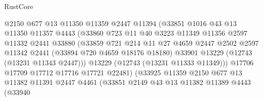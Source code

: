 \begin{lexlean}{RustCore}
\begin{coremodule}
                              @2150
                              @677
                              @13
                              @11350
                              @11359
                              @2447
                              @11394
                              (@33851
                                @1016
                                @43
                                @13
                                @11350
                                @11357
                                @4443
                                (@33860
                                  @723
                                  @11
                                  @40
                                  @3223
                                  @11349
                                  @11356
                                  @2597
                                  @11332
                                  @2441
                                  @33880
                                  (@33859
                                    @721
                                    @214
                                    @11
                                    @27
                                    @4659
                                    @2447
                                    @2502
                                    @2597
                                    @11342
                                    @2441
                                    (@33894 @720 @4659 @18176 @18180)
                                    @33901
                                    @13229
                                    (@12743 (@13231 @11343 @2447)))
                                  @13229
                                  (@12743 (@13231 @11333 @11349)))
                                @17706
                                @17709
                                @17712
                                @17716
                                @17721
                                @22481)
                              (@33925
                                @11359
                                @2150
                                @677
                                @13
                                @11382
                                @11391
                                @2447
                                @4461
                                (@33851
                                  @2149
                                  @43
                                  @13
                                  @11382
                                  @11389
                                  @4443
                                  (@33940

\end{coremodule}
\end{lexlean}
